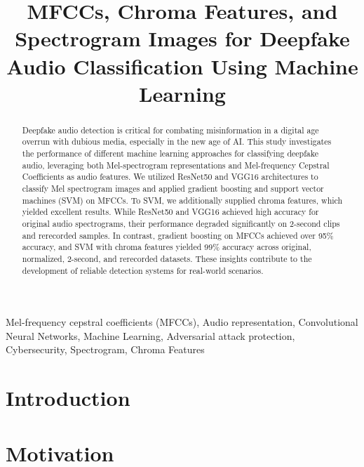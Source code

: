 \documentclass[conference]{IEEEtran}
\begin{document}
\title{MFCCs, Chroma Features, and Spectrogram Images for Deepfake Audio Classification Using Machine Learning}

\author{
}

\maketitle

\begin{abstract}
Deepfake audio detection is critical for combating misinformation in a digital age overrun with dubious media, especially in the new age of AI. This study investigates the performance of different machine learning approaches for classifying deepfake audio, leveraging both Mel-spectrogram representations and Mel-frequency Cepstral Coefficients as audio features. We utilized ResNet50 and VGG16 architectures to classify Mel spectrogram images and applied gradient boosting and support vector machines (SVM) on MFCCs. To SVM, we additionally supplied chroma features, which yielded excellent results.  While ResNet50 and VGG16 achieved high accuracy for original audio spectrograms, their performance degraded significantly on 2-second clips and rerecorded samples. In contrast, gradient boosting on MFCCs achieved over 95\% accuracy, and SVM with chroma features yielded 99\% accuracy across original, normalized, 2-second, and rerecorded datasets. These insights contribute to the development of reliable detection systems for real-world scenarios.
\end{abstract}

\begin{IEEEkeywords}
Mel-frequency cepstral coefficients (MFCCs),
Audio representation,
Convolutional Neural Networks,
Machine Learning,
Adversarial attack protection, 
Cybersecurity,
Spectrogram, 
Chroma Features
\end{IEEEkeywords}


\section{Introduction}

\section{Motivation}
\end{document}

